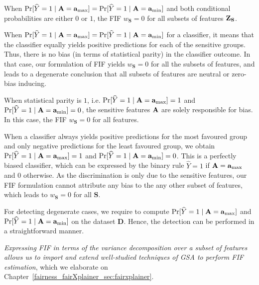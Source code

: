 \begin{proposition}
	When $ \Pr[\widehat{Y} = 1 \mid \mathbf{A} = \mathbf{a}_{\max} ] = \Pr[\widehat{Y} = 1 \mid \mathbf{A} = \mathbf{a}_{\min} ] $ and both conditional probabilities are either $ 0 $ or $ 1 $, the FIF $w_{\mathbf{S}}  = 0 $ for all subsets of features $ \mathbf{Z}_{\mathbf{S}} $.
\end{proposition}
When $ \Pr[\widehat{Y} = 1 \mid \mathbf{A} = \mathbf{a}_{\max} ] = \Pr[\widehat{Y} = 1 \mid \mathbf{A} = \mathbf{a}_{\min} ] $ for a classifier, it means that the classifier equally yields positive predictions for each of the sensitive groups. Thus, there is no bias (in terms of statistical parity) in the classifier outcome. In that case, our formulation of FIF yields $w_{\mathbf{S}}  = 0 $ for all the subsets of features, and leads to a degenerate conclusion that all subsets of features are neutral or zero-bias inducing.
\begin{proposition}
	{When statistical parity is $ 1 $, i.e. $ \Pr[\widehat{Y} = 1 \mid \mathbf{A} = \mathbf{a}_{\max} ] = 1 $ and $ \Pr[\widehat{Y} = 1 \mid \mathbf{A} = \mathbf{a}_{\min} ] = 0 $, the sensitive features $ \mathbf{A} $ are solely responsible for bias. In this case, the FIF $ w_{\mathbf{S}} = 0 $ for all features.}
\end{proposition}
When a classifier always yields positive predictions for the most favoured group and only negative predictions for the least favoured group, we obtain $ \Pr[\widehat{Y} = 1 \mid \mathbf{A} = \mathbf{a}_{\max} ] = 1 $ and $ \Pr[\widehat{Y} = 1 \mid \mathbf{A} = \mathbf{a}_{\min} ] = 0 $. This is a perfectly biased classifier, which can be expressed by the binary rule $\widehat{Y} = 1$ if $\mathbf{A} = \mathbf{a}_{\max}$ and $0$ otherwise. As the discrimination is only due to the sensitive features, our FIF formulation cannot attribute any bias to the any other subset of  features, which leads to $ w_{\mathbf{S}} = 0 $ for all $\mathbf{S}$.


\begin{remark}
	For detecting degenerate cases, we require to compute $ \Pr[\widehat{Y} = 1 \mid \mathbf{A} = \mathbf{a}_{\max} ]  $ and $ \Pr[\widehat{Y} = 1 \mid \mathbf{A} = \mathbf{a}_{\min} ]  $ on the dataset $ \mathbf{D} $. Hence, the detection can be performed in a straightforward manner.
\end{remark}


\textit{Expressing FIF in terms of the variance decomposition over a subset of features allows us to import and extend well-studied techniques of GSA to perform FIF estimation}, which we elaborate on Chapter~\ref{fairness_fairXplainer_sec:fairxplainer}.
